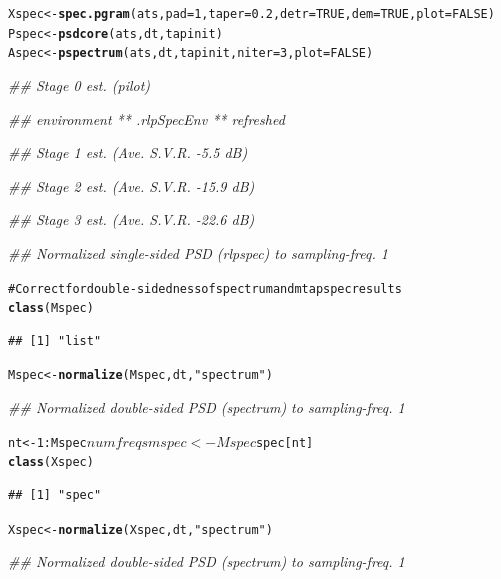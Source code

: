 \documentclass{article}\usepackage{graphicx, color}
\makeatletter
\newcommand{\hlfunctioncall}[1]{\textcolor[rgb]{0.501960784313725,0,0.329411764705882}{\textbf{#1}}}%
\newcommand{\hlstring}[1]{\textcolor[rgb]{0.6,0.6,1}{#1}}%
\newcommand{\hlcomment}[1]{\textcolor[rgb]{0.180392156862745,0.6,0.341176470588235}{#1}}%
\newenvironment{kframe}{%
 \def\at@end@of@kframe{}%
 \ifinner\ifhmode%
  \def\at@end@of@kframe{\end{minipage}}%
  \begin{minipage}{\columnwidth}%
 \fi\fi%
 \def\FrameCommand##1{\hskip\@totalleftmargin \hskip-\fboxsep
 \colorbox{shadecolor}{##1}\hskip-\fboxsep
     \hskip-\linewidth \hskip-\@totalleftmargin \hskip\columnwidth}%
 \MakeFramed {\advance\hsize-\width
   \@totalleftmargin\z@ \linewidth\hsize
   \@setminipage}}%
 {\par\unskip\endMakeFramed%
 \at@end@of@kframe}
\newenvironment{knitrout}{}{} %
\makeatother
\begin{document}
\begin{knitrout}
\color{fgcolor}\begin{kframe}
\begin{alltt}
Xspec <- \hlfunctioncall{spec.pgram}(ats, pad = 1, taper = 0.2, detr = TRUE, dem = TRUE, plot = FALSE)
Pspec <- \hlfunctioncall{psdcore}(ats, dt, tapinit)
Aspec <- \hlfunctioncall{pspectrum}(ats, dt, tapinit, niter = 3, plot = FALSE)
\end{alltt}


{\ttfamily\noindent\itshape\textcolor{messagecolor}{\#\# Stage  0 est. (pilot)}}

{\ttfamily\noindent\itshape\textcolor{messagecolor}{\#\# 	environment  ** .rlpSpecEnv **  refreshed}}

{\ttfamily\noindent\itshape\textcolor{messagecolor}{\#\# Stage  1 est. (Ave. S.V.R. -5.5 dB)}}

{\ttfamily\noindent\itshape\textcolor{messagecolor}{\#\# Stage  2 est. (Ave. S.V.R. -15.9 dB)}}

{\ttfamily\noindent\itshape\textcolor{messagecolor}{\#\# Stage  3 est. (Ave. S.V.R. -22.6 dB)}}

{\ttfamily\noindent\itshape\textcolor{messagecolor}{\#\# Normalized  single-sided PSD  (rlpspec)  to sampling-freq.  1}}\begin{alltt}
\hlcomment{# Correct for double-sidedness of spectrum and mtapspec results}
\hlfunctioncall{class}(Mspec)
\end{alltt}
\begin{verbatim}
## [1] "list"
\end{verbatim}
\begin{alltt}
Mspec <- \hlfunctioncall{normalize}(Mspec, dt, \hlstring{"spectrum"})
\end{alltt}


{\ttfamily\noindent\itshape\textcolor{messagecolor}{\#\# Normalized  double-sided PSD  (spectrum)  to sampling-freq.  1}}\begin{alltt}
nt <- 1:Mspec$numfreqs
mspec <- Mspec$spec[nt]
\hlfunctioncall{class}(Xspec)
\end{alltt}
\begin{verbatim}
## [1] "spec"
\end{verbatim}
\begin{alltt}
Xspec <- \hlfunctioncall{normalize}(Xspec, dt, \hlstring{"spectrum"})
\end{alltt}


{\ttfamily\noindent\itshape\textcolor{messagecolor}{\#\# Normalized  double-sided PSD  (spectrum)  to sampling-freq.  1}}\end{kframe}
\end{knitrout}
\end{document}
